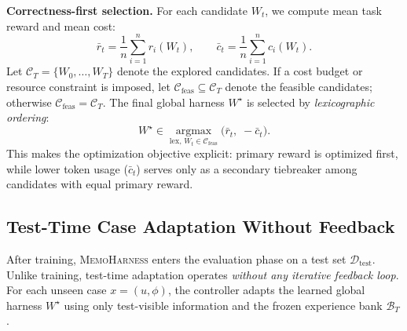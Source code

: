 \documentclass{article}
\newcommand{\method}{\textsc{MemoHarness}\xspace}
\newcommand{\methodlabel}[1]{\noindent\textbf{\textcolor{narrareddeep}{#1}}}
\begin{document}
\methodlabel{Correctness-first selection.}
For each candidate $W_t$, we compute mean task reward and mean cost:
\begin{equation}
\label{eq:mean_rewards}
\bar{r}_t
=
\frac{1}{n}
\sum_{i=1}^{n} r_i(W_t),
\qquad
\bar{c}_t
=
\frac{1}{n}
\sum_{i=1}^{n} c_i(W_t).
\end{equation}
Let $\mathcal{C}_T=\{W_0,\ldots,W_T\}$ denote the explored candidates. If a
cost budget or resource constraint is imposed, let
$\mathcal{C}_{\mathrm{feas}}\subseteq\mathcal{C}_T$ denote the feasible
candidates; otherwise $\mathcal{C}_{\mathrm{feas}}=\mathcal{C}_T$. The final
global harness $W^\star$ is selected by \emph{lexicographic ordering}:
\begin{equation}
\label{eq:selection}
W^\star
\in
\operatorname*{\arg\max}_{\mathrm{lex},\, W_t \in \mathcal{C}_{\mathrm{feas}}}
\bigl(\bar{r}_t,\; -\bar{c}_t\bigr).
\end{equation}
\noindent
This makes the optimization objective explicit: primary reward is optimized
first, while lower token usage ($\bar{c}_t$) serves only as a secondary
tiebreaker among candidates with equal primary reward.

\subsection{Test-Time Case Adaptation Without Feedback}
\label{sec:test_time}

After training, \method enters the evaluation phase on a test set
$\mathcal{D}_{\mathrm{test}}$.
Unlike training, test-time adaptation operates \emph{without any iterative
feedback loop}.
For each unseen case $x=(u,\phi)$, the controller adapts the learned
global harness $W^\star$ using only
test-visible information and the frozen experience bank $\mathcal{B}_T$.
\end{document}
